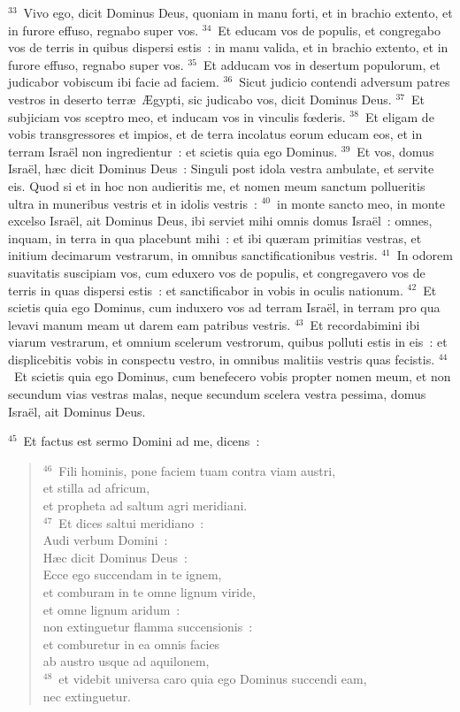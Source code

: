 ${}^{33}$~Vivo ego, dicit Dominus Deus, quoniam in manu forti, et in brachio extento, et in furore effuso, regnabo super vos.
${}^{34}$~Et educam vos de populis, et congregabo vos de terris in quibus dispersi estis~: in manu valida, et in brachio extento, et in furore effuso, regnabo super vos.
${}^{35}$~Et adducam vos in desertum populorum, et judicabor vobiscum ibi facie ad faciem.
${}^{36}$~Sicut judicio contendi adversum patres vestros in deserto terr\ae\ \AE gypti, sic judicabo vos, dicit Dominus Deus.
${}^{37}$~Et subjiciam vos sceptro meo, et inducam vos in vinculis fœderis.
${}^{38}$~Et eligam de vobis transgressores et impios, et de terra incolatus eorum educam eos, et in terram Isra\"el non ingredientur~: et scietis quia ego Dominus.
${}^{39}$~Et vos, domus Isra\"el, h\ae c dicit Dominus Deus~: Singuli post idola vestra ambulate, et servite eis. Quod si et in hoc non audieritis me, et nomen meum sanctum pollueritis ultra in muneribus vestris et in idolis vestris~:
${}^{40}$~in monte sancto meo, in monte excelso Isra\"el, ait Dominus Deus, ibi serviet mihi omnis domus Isra\"el~: omnes, inquam, in terra in qua placebunt mihi~: et ibi qu\ae ram primitias vestras, et initium decimarum vestrarum, in omnibus sanctificationibus vestris.
${}^{41}$~In odorem suavitatis suscipiam vos, cum eduxero vos de populis, et congregavero vos de terris in quas dispersi estis~: et sanctificabor in vobis in oculis nationum.
${}^{42}$~Et scietis quia ego Dominus, cum induxero vos ad terram Isra\"el, in terram pro qua levavi manum meam ut darem eam patribus vestris.
${}^{43}$~Et recordabimini ibi viarum vestrarum, et omnium scelerum vestrorum, quibus polluti estis in eis~: et displicebitis vobis in conspectu vestro, in omnibus malitiis vestris quas fecistis.
${}^{44}$~Et scietis quia ego Dominus, cum benefecero vobis propter nomen meum, et non secundum vias vestras malas, neque secundum scelera vestra pessima, domus Isra\"el, ait Dominus Deus.


${}^{45}$~Et factus est sermo Domini ad me, dicens~:
\begin{verse}${}^{46}$~Fili hominis, pone faciem tuam contra viam austri,\\ et stilla ad africum,\\ et propheta ad saltum agri meridiani.\\
${}^{47}$~Et dices saltui meridiano~:\\ Audi verbum Domini~:\\ H\ae c dicit Dominus Deus~:\\ Ecce ego succendam in te ignem,\\ et comburam in te omne lignum viride,\\ et omne lignum aridum~:\\ non extinguetur flamma succensionis~:\\ et comburetur in ea omnis facies\\ ab austro usque ad aquilonem,\\
${}^{48}$~et videbit universa caro quia ego Dominus succendi eam,\\ nec extinguetur.\end{verse}


